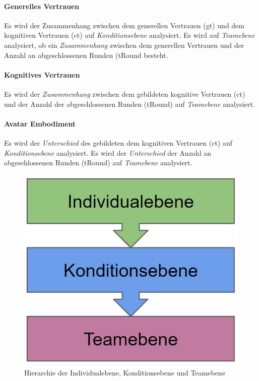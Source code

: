 \documentclass[a4paper,11pt]{article}%
\renewcommand{\\}{\vspace*{0.5\baselineskip} \newline}
\begin{document}
\paragraph{Generelles Vertrauen}
Es wird der Zusammenhang zwischen dem generellen Vertrauen (\ac{gt}) und dem kognitiven Vertrauen (\ac{ct}) auf \textit{Konditionsebene} analysiert.
Es wird auf \textit{Teamebene} analysiert, ob ein \textit{Zusammenhang} zwischen dem generellen Vertrauen und der Anzahl an abgeschlossenen Runden (\ac{tRound} besteht.

\paragraph{Kognitives Vertrauen}
Es wird der \textit{Zusammenhang} zwischen dem gebildeten kognitive Vertrauen (\ac{ct}) und der Anzahl der abgeschlossenen Runden (\ac{tRound}) auf \textit{Teamebene} analysiert.

\paragraph{Avatar Embodiment}
Es wird der \textit{Unterschied} des gebildeten dem kognitiven Vertrauen (\ac{ct}) auf \textit{Konditionsebene} analysiert.
Es wird der \textit{Unterschied} der Anzahl an abgeschlossenen Runden (\ac{tRound}) auf \textit{Teamebene} analysiert.


\begin{figure}[H]
		\begin{footnotesize}
		\centering
			\includegraphics[scale=0.4]{Abbildungen/DifferentLevels.JPG}
			
			\caption[Abbildung 1]{Hierarchie der Individualebene, Konditionsebene und Teamebene}
			\label{DifferentLevels}
		\end{footnotesize}
	\end{figure}
\end{document}
